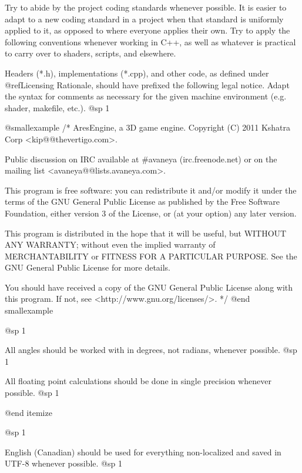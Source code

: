 
Try to abide by the project coding standards whenever possible. It is easier to adapt to a new coding standard in a project when that standard is uniformly applied to it, as opposed to where everyone applies their own. Try to apply the following conventions whenever working in C++, as well as whatever is practical to carry over to shaders, scripts, and elsewhere.

Headers (*.h), implementations (*.cpp), and other code, as defined under @ref{Licensing Rationale}, should have prefixed the following legal notice. Adapt the syntax for comments as necessary for the given machine environment (e.g. shader, makefile, etc.).
@sp 1

@smallexample
/*
    AresEngine, a 3D game engine.
    Copyright (C) 2011 Kshatra Corp <kip@@thevertigo.com>.

    Public discussion on IRC available at #avaneya (irc.freenode.net)
    or on the mailing list <avaneya@@lists.avaneya.com>.

    This program is free software: you can redistribute it and/or modify
    it under the terms of the GNU General Public License as published by
    the Free Software Foundation, either version 3 of the License, or
    (at your option) any later version.

    This program is distributed in the hope that it will be useful,
    but WITHOUT ANY WARRANTY; without even the implied warranty of
    MERCHANTABILITY or FITNESS FOR A PARTICULAR PURPOSE.  See the
    GNU General Public License for more details.

    You should have received a copy of the GNU General Public License
    along with this program.  If not, see <http://www.gnu.org/licenses/>.
*/
@end smallexample

@sp 1

\itemize
\item
All angles should be worked with in degrees, not radians, whenever possible.
@sp 1

\item
All floating point calculations should be done in single precision whenever possible.
@sp 1

@end itemize

@sp 1

\itemize

\item
English (Canadian) should be used for everything non-localized and saved in UTF-8 whenever possible.
@sp 1

